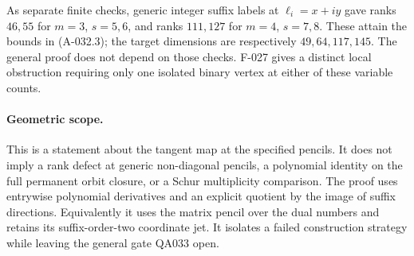 As separate finite checks, generic integer suffix labels at
\(\ell_i=x+i y\) gave ranks \(46,55\) for \(m=3\),
\(s=5,6\), and ranks \(111,127\) for \(m=4\),
\(s=7,8\). These attain the bounds in (A-032.3); the target
dimensions are respectively \(49,64,117,145\).
The general proof does not depend on those checks.
F-027 gives a distinct local obstruction requiring only
one isolated binary vertex at either of these variable counts.

\paragraph{Geometric scope.}
This is a statement about the tangent map at the specified
pencils. It does not imply a rank defect at generic non-diagonal
pencils, a polynomial identity on the full permanent orbit
closure, or a Schur multiplicity comparison.
The proof uses entrywise polynomial derivatives and an explicit
quotient by the image of suffix directions. Equivalently it
uses the matrix pencil over the dual numbers and retains its
suffix-order-two coordinate jet. It isolates a failed
construction strategy while leaving the general gate QA033 open.
